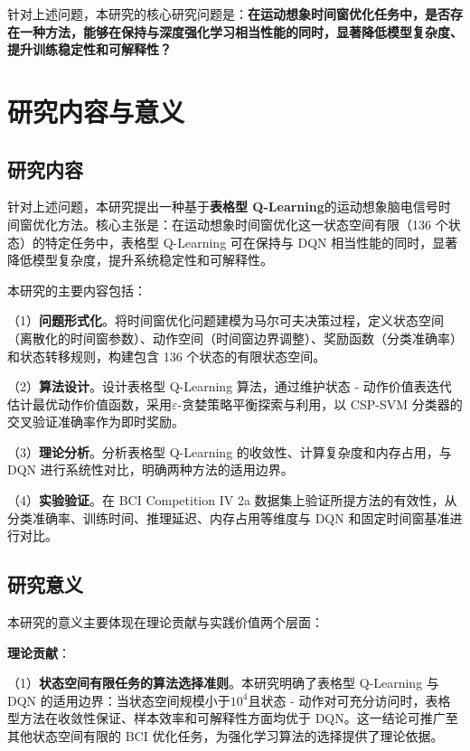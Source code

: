 针对上述问题，本研究的核心研究问题是：\textbf{在运动想象时间窗优化任务中，是否存在一种方法，能够在保持与深度强化学习相当性能的同时，显著降低模型复杂度、提升训练稳定性和可解释性？}

\section{研究内容与意义}
\label{sec:research_content}

\subsection{研究内容}
\label{subsec:research_content}

针对上述问题，本研究提出一种基于\textbf{表格型 Q-Learning}的运动想象脑电信号时间窗优化方法。核心主张是：在运动想象时间窗优化这一状态空间有限（136 个状态）的特定任务中，表格型 Q-Learning 可在保持与 DQN 相当性能的同时，显著降低模型复杂度，提升系统稳定性和可解释性。

本研究的主要内容包括：

（1）\textbf{问题形式化}。将时间窗优化问题建模为马尔可夫决策过程\cite{sutton2018reinforcement}，定义状态空间（离散化的时间窗参数）、动作空间（时间窗边界调整）、奖励函数（分类准确率）和状态转移规则，构建包含 136 个状态的有限状态空间。

（2）\textbf{算法设计}。设计表格型 Q-Learning 算法，通过维护状态 - 动作价值表迭代估计最优动作价值函数，采用$\varepsilon$-贪婪策略平衡探索与利用，以 CSP-SVM 分类器的交叉验证准确率作为即时奖励\cite{watkins1992q}。

（3）\textbf{理论分析}。分析表格型 Q-Learning 的收敛性、计算复杂度和内存占用，与 DQN 进行系统性对比，明确两种方法的适用边界。

（4）\textbf{实验验证}。在 BCI Competition IV 2a 数据集上验证所提方法的有效性，从分类准确率、训练时间、推理延迟、内存占用等维度与 DQN 和固定时间窗基准进行对比。

\subsection{研究意义}
\label{subsec:contributions}

本研究的意义主要体现在理论贡献与实践价值两个层面：

\textbf{理论贡献}：

（1）\textbf{状态空间有限任务的算法选择准则}。本研究明确了表格型 Q-Learning 与 DQN 的适用边界：当状态空间规模小于$10^4$且状态 - 动作对可充分访问时，表格型方法在收敛性保证、样本效率和可解释性方面均优于 DQN。这一结论可推广至其他状态空间有限的 BCI 优化任务，为强化学习算法的选择提供了理论依据。

